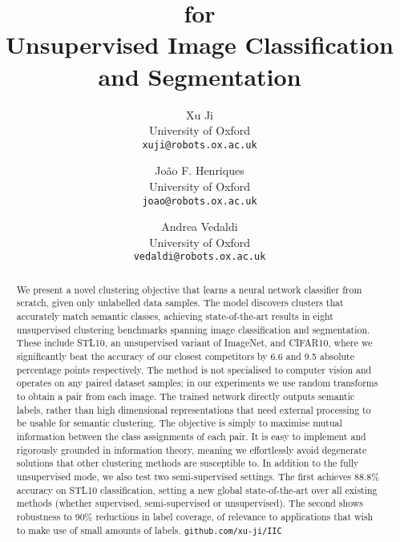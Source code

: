 \documentclass[10pt,twocolumn,letterpaper]{article}
\title{\methodname for \\ Unsupervised Image Classification and Segmentation}
\author{Xu Ji\\
University of Oxford\\
{\tt\small xuji@robots.ox.ac.uk}
\and
Jo\~ao F. Henriques\\
University of Oxford\\
{\tt\small joao@robots.ox.ac.uk}
\and
Andrea Vedaldi\\
University of Oxford\\
{\tt\small vedaldi@robots.ox.ac.uk}}
\begin{document}
\maketitle
\begin{abstract}


We present a novel clustering objective that learns a neural network classifier from scratch, given only unlabelled data samples.
The model discovers clusters that accurately match semantic classes, achieving state-of-the-art results in eight unsupervised clustering benchmarks spanning image classification and segmentation.
These include STL10, an unsupervised variant of ImageNet, and CIFAR10, where we significantly beat the accuracy of our closest competitors by 6.6 and 9.5 absolute percentage points respectively.
The method is not specialised to computer vision and operates on any paired dataset samples; in our experiments we use random transforms to obtain a pair from each image. 
The trained network directly outputs semantic labels, rather than high dimensional representations that need external processing to be usable for semantic clustering.
The objective is simply to maximise mutual information between the class assignments of each pair.
It is easy to implement and rigorously grounded in information theory, meaning we effortlessly avoid degenerate solutions that other clustering methods are susceptible to.
In addition to the fully unsupervised mode, we also test two semi-supervised settings. The first achieves 88.8\% accuracy on STL10 classification, setting a new global state-of-the-art over all existing methods (whether supervised, semi-supervised or unsupervised).
The second shows robustness to 90\% reductions in label coverage, of relevance to applications that wish to make use of small amounts of labels. \lstinline[basicstyle=\ttfamily]{github.com/xu-ji/IIC} 



\end{abstract}
\end{document}
